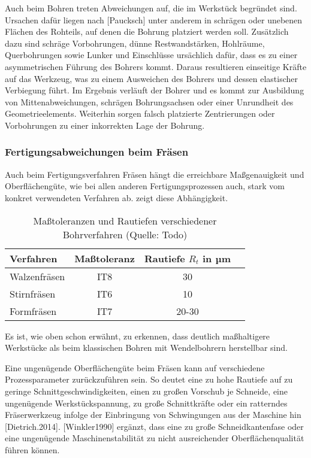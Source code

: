 Auch beim Bohren treten Abweichungen auf, die im Werkstück begründet sind. Ursachen dafür liegen nach [Paucksch] unter anderem in schrägen oder unebenen Flächen des Rohteils, auf denen die Bohrung platziert werden soll. Zusätzlich dazu sind schräge Vorbohrungen, dünne Restwandstärken, Hohlräume, Querbohrungen sowie Lunker und Einschlüsse ursächlich dafür, dass es zu einer asymmetrischen Führung des Bohrers kommt. Daraus resultieren einseitige Kräfte auf das Werkzeug, was zu einem Ausweichen des Bohrers und dessen elastischer Verbiegung führt. Im Ergebnis verläuft der Bohrer und es kommt zur Ausbildung von Mittenabweichungen, schrägen Bohrungsachsen oder einer Unrundheit des Geometrieelements.
Weiterhin sorgen falsch platzierte Zentrierungen oder Vorbohrungen zu einer inkorrekten Lage der Bohrung.   

\subsubsection {Fertigungsabweichungen beim Fräsen}

Auch beim Fertigungsverfahren Fräsen hängt die erreichbare Maßgenauigkeit und Oberflächengüte, wie bei allen anderen Fertigungsprozessen auch, stark vom konkret verwendeten Verfahren ab.  zeigt diese Abhängigkeit. 

 
 \begin{table}[h]	
 	
 	\begin{tabularx}{\columnwidth}{|X|c|c|l|}	
 		
 		
 		\hline
 		\textbf{Verfahren}&\textbf{Maßtoleranz}&\textbf{Rautiefe $R_{t}$ in µm}\\
 		\hline
 		Walzenfräsen&IT8&30\\
 		\hline
 		Stirnfräsen&IT6&10\\
 		\hline
 		Formfräsen&IT7&20-30\\
 		\hline
 		
 	\end{tabularx}
 	
 	\caption{Maßtoleranzen und Rautiefen verschiedener Bohrverfahren (Quelle: Todo)}
 	\label{tab:fraesqualität}
 	
 \end{table}

Es ist, wie oben schon erwähnt, zu erkennen, dass deutlich maßhaltigere Werkstücke als beim klassischen Bohren mit Wendelbohrern herstellbar sind. 

Eine ungenügende Oberflächengüte beim Fräsen kann auf verschiedene Prozessparameter zurückzuführen sein. So deutet eine zu hohe Rautiefe auf zu geringe Schnittgeschwindigkeiten, einen zu großen Vorschub je Schneide, eine ungenügende Werkstückspannung, zu große Schnittkräfte oder ein ratterndes Fräserwerkzeug infolge der Einbringung von Schwingungen aus der Maschine hin [Dietrich.2014].
[Winkler1990] ergänzt, dass eine zu große Schneidkantenfase oder eine ungenügende Maschinenstabilität zu nicht ausreichender Oberflächenqualität führen können. 

